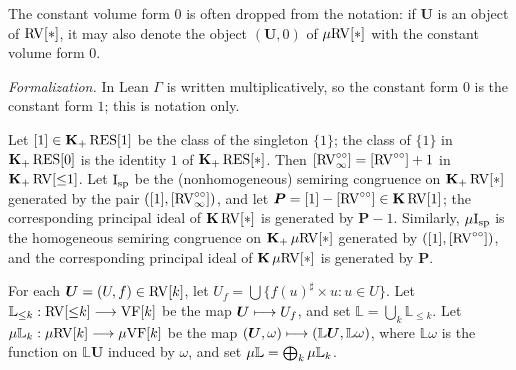 \setcounter{theorem}{18}
\begin{definition}
\label{drop-0}
\leanok
{}
The constant volume form $0$ is often dropped from the notation: if $\boldsymbol{U}$ is an object of $\mathrm{RV}[*]$, it may also denote the object $(\boldsymbol{U}, 0)$ of $\mu\mathrm{RV}[*]$ with the constant volume form $0$.

\emph{Formalization.} In Lean $\Gamma$ is written multiplicatively, so the constant form $0$ is the constant form $1$; this is notation only.
\end{definition}

\setcounter{theorem}{19}
\begin{definition}
\label{s3-special-congruence}
\leanok
{}
Let $[1] \in \operatorname{\mathbf{K}_+} \mathrm{RES}[1]$ be the class of the singleton $\{1\}$; the class of $\{1\}$ in $\operatorname{\mathbf{K}_+} \mathrm{RES}[0]$ is the identity $1$ of $\operatorname{\mathbf{K}_+} \mathrm{RES}[*]$. Then $[\mathrm{RV}^{\circ\circ}_\infty] = [\mathrm{RV}^{\circ\circ}] + 1$ in $\operatorname{\mathbf{K}_+} \mathrm{RV}[{\leq}1]$. Let $\mathrm{I}_{\mathrm{sp}}$ be the (nonhomogeneous) semiring congruence on $\operatorname{\mathbf{K}_+} \mathrm{RV}[*]$ generated by the pair $([1], [\mathrm{RV}^{\circ\circ}_\infty])$, and let $\boldsymbol{P} = [1] - [\mathrm{RV}^{\circ\circ}] \in \operatorname{\mathbf{K}} \mathrm{RV}[1]$; the corresponding principal ideal of $\operatorname{\mathbf{K}} \mathrm{RV}[*]$ is generated by $\boldsymbol{P} - 1$. Similarly, $\mu\mathrm{I}_{\mathrm{sp}}$ is the homogeneous semiring congruence on $\operatorname{\mathbf{K}_+} \mu\mathrm{RV}[*]$ generated by $([1], [\mathrm{RV}^{\circ\circ}])$, and the corresponding principal ideal of $\operatorname{\mathbf{K}} \mu\mathrm{RV}[*]$ is generated by $\boldsymbol{P}$.
\end{definition}

\setcounter{theorem}{20}
\begin{definition}
\label{RVcat-tag}
\leanok
{}
For each $\boldsymbol{U} = (U, f) \in \mathrm{RV}[k]$, let $U_f = \bigcup \{ f(u)^\sharp \times u : u \in U \}$. Let $\mathbb{L}_{\leq k} : \mathrm{RV}[{\leq}k] \longrightarrow \mathrm{VF}[k]$ be the map $\boldsymbol{U} \longmapsto U_f$, and set $\mathbb{L} = \bigcup_k \mathbb{L}_{\leq k}$. Let $\mu\mathbb{L}_k : \mu\mathrm{RV}[k] \longrightarrow \mu\mathrm{VF}[k]$ be the map $(\boldsymbol{U}, \omega) \longmapsto (\mathbb{L} \boldsymbol{U}, \mathbb{L} \omega)$, where $\mathbb{L} \omega$ is the function on $\mathbb{L} \boldsymbol{U}$ induced by $\omega$, and set $\mu\mathbb{L} = \bigoplus_k \mu\mathbb{L}_k$.
\end{definition}

